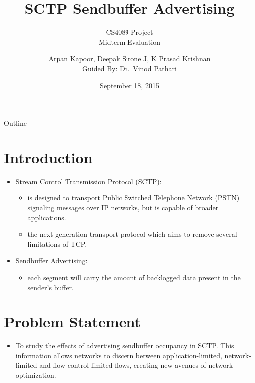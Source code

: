 \documentclass{beamer}
\title{SCTP Sendbuffer Advertising}
\subtitle{CS4089 Project\\
	Midterm Evaluation}
\author{Arpan Kapoor, Deepak Sirone J, K Prasad Krishnan\\
	Guided By: Dr.~Vinod Pathari}
\date{September 18, 2015}
\begin{document}
\begin{frame}
	\titlepage
\end{frame}

\begin{frame}{Outline}
	\tableofcontents
\end{frame}

\section{Introduction}
\begin{frame}{\insertsection}

\begin{itemize}
	\item Stream Control Transmission Protocol (SCTP):
	\begin{itemize}
		\item is designed to transport Public Switched Telephone
			Network (PSTN) signaling messages over IP networks, but
			is capable of broader applications.
	\end{itemize}
	\begin{itemize}
		\item the next generation transport protocol which aims to
			remove several limitations of TCP.
	\end{itemize}
\end{itemize}

\begin{itemize}
	\item Sendbuffer Advertising:
	\begin{itemize}
		\item each segment will carry the amount of backlogged data
			present in the sender's buffer.
	\end{itemize}
\end{itemize}

\end{frame}

\section{Problem Statement}
\begin{frame}{\insertsection}
\begin{itemize}
	\item To study the effects of advertising sendbuffer occupancy in SCTP.
		This information allows networks to discern between
		application-limited, network-limited and flow-control limited
		flows, creating new avenues of network optimization.
\end{itemize}
\end{frame}
\end{document}
